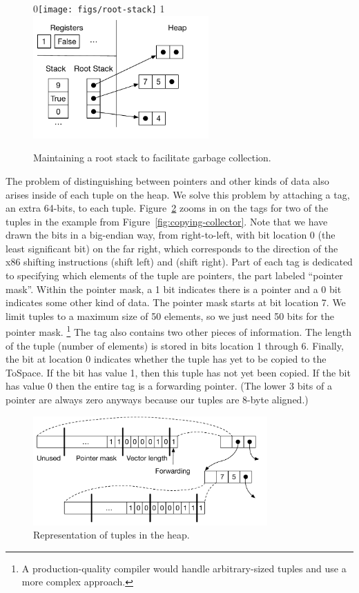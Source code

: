 \documentclass[7x10,nocrop]{TimesAPriori_MIT}%
\def\racketEd{0}
\def\pythonEd{1}
\def\edition{1}
\newcommand{\racket}[1]{{\if\edition\racketEd{#1}\fi}}
\newcommand{\python}[1]{{\if\edition\pythonEd #1\fi}}
\begin{document}
\begin{figure}[tbp]
  \centering
  \racket{\texttt{[image: figs/root-stack]}}
  \python{\includegraphics[width=0.60\textwidth]{figs/root-stack-python}}
\caption{Maintaining a root stack to facilitate garbage collection.}
\label{fig:shadow-stack}
\end{figure}

The problem of distinguishing between pointers and other kinds of data
also arises inside of each tuple on the heap. We solve this problem by
attaching a tag, an extra 64-bits, to each
tuple. Figure~\ref{fig:tuple-rep} zooms in on the tags for two of the
tuples in the example from Figure~\ref{fig:copying-collector}. Note
that we have drawn the bits in a big-endian way, from right-to-left,
with bit location 0 (the least significant bit) on the far right,
which corresponds to the direction of the x86 shifting instructions
 (shift left) and  (shift right). Part of each tag
is dedicated to specifying which elements of the tuple are pointers,
the part labeled ``pointer mask''. Within the pointer mask, a 1 bit
indicates there is a pointer and a 0 bit indicates some other kind of
data. The pointer mask starts at bit location 7. We limit tuples to a
maximum size of 50 elements, so we just need 50 bits for the pointer
mask.%
%
\footnote{A production-quality compiler would handle
arbitrary-sized tuples and use a more complex approach.}
%
The tag also contains two other pieces of information. The length of
the tuple (number of elements) is stored in bits location 1 through
6. Finally, the bit at location 0 indicates whether the tuple has yet
to be copied to the ToSpace.  If the bit has value 1, then this tuple
has not yet been copied.  If the bit has value 0 then the entire tag
is a forwarding pointer. (The lower 3 bits of a pointer are always
zero anyways because our tuples are 8-byte aligned.)

\begin{figure}[tbp]
\centering \includegraphics[width=0.8\textwidth]{figs/tuple-rep}
\caption{Representation of tuples in the heap.}
\label{fig:tuple-rep}
\end{figure}
\end{document}
